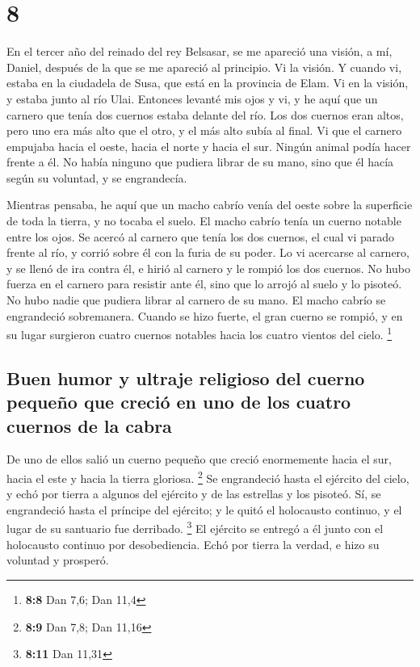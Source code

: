 \hypertarget{section-7}{%
\section{8}\label{section-7}}

 En el tercer año del reinado del rey Belsasar, se me
apareció una visión, a mí, Daniel, después de la que se me apareció al
principio.  Vi la visión. Y cuando vi, estaba en la
ciudadela de Susa, que está en la provincia de Elam. Vi en la visión, y
estaba junto al río Ulai.  Entonces levanté mis ojos y vi,
y he aquí que un carnero que tenía dos cuernos estaba delante del río.
Los dos cuernos eran altos, pero uno era más alto que el otro, y el más
alto subía al final.  Vi que el carnero empujaba hacia el
oeste, hacia el norte y hacia el sur. Ningún animal podía hacer frente a
él. No había ninguno que pudiera librar de su mano, sino que él hacía
según su voluntad, y se engrandecía.

 Mientras pensaba, he aquí que un macho cabrío venía del
oeste sobre la superficie de toda la tierra, y no tocaba el suelo. El
macho cabrío tenía un cuerno notable entre los ojos.  Se
acercó al carnero que tenía los dos cuernos, el cual vi parado frente al
río, y corrió sobre él con la furia de su poder.  Lo vi
acercarse al carnero, y se llenó de ira contra él, e hirió al carnero y
le rompió los dos cuernos. No hubo fuerza en el carnero para resistir
ante él, sino que lo arrojó al suelo y lo pisoteó. No hubo nadie que
pudiera librar al carnero de su mano.  El macho cabrío se
engrandeció sobremanera. Cuando se hizo fuerte, el gran cuerno se
rompió, y en su lugar surgieron cuatro cuernos notables hacia los cuatro
vientos del cielo. \footnote{\textbf{8:8} Dan 7,6; Dan 11,4}

\hypertarget{buen-humor-y-ultraje-religioso-del-cuerno-pequeuxf1o-que-creciuxf3-en-uno-de-los-cuatro-cuernos-de-la-cabra}{%
\subsection{Buen humor y ultraje religioso del cuerno pequeño que creció
en uno de los cuatro cuernos de la
cabra}\label{buen-humor-y-ultraje-religioso-del-cuerno-pequeuxf1o-que-creciuxf3-en-uno-de-los-cuatro-cuernos-de-la-cabra}}

 De uno de ellos salió un cuerno pequeño que creció
enormemente hacia el sur, hacia el este y hacia la tierra gloriosa.
\footnote{\textbf{8:9} Dan 7,8; Dan 11,16}  Se
engrandeció hasta el ejército del cielo, y echó por tierra a algunos del
ejército y de las estrellas y los pisoteó.  Sí, se
engrandeció hasta el príncipe del ejército; y le quitó el holocausto
continuo, y el lugar de su santuario fue derribado. \footnote{\textbf{8:11}
  Dan 11,31}  El ejército se entregó a él junto con el
holocausto continuo por desobediencia. Echó por tierra la verdad, e hizo
su voluntad y prosperó.

